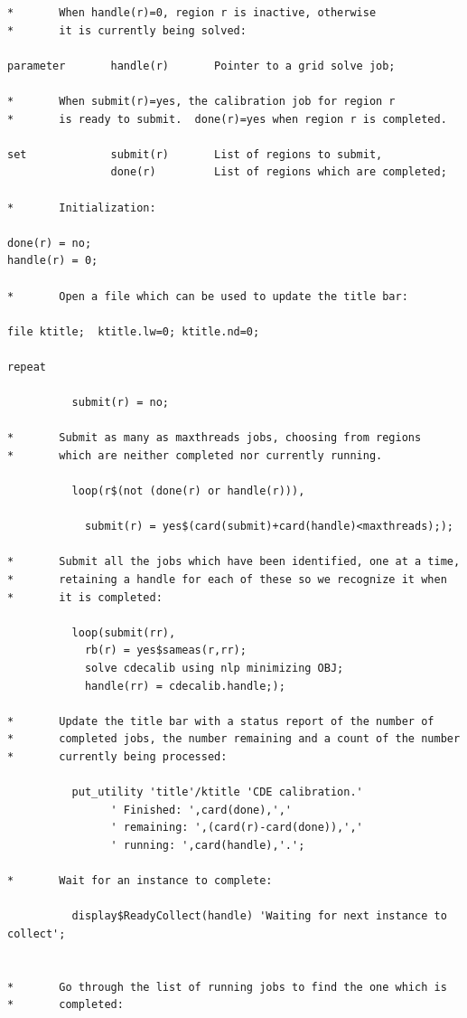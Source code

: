 \begin{Verbatim}
*       When handle(r)=0, region r is inactive, otherwise 
*       it is currently being solved:

parameter       handle(r)       Pointer to a grid solve job;

*       When submit(r)=yes, the calibration job for region r
*       is ready to submit.  done(r)=yes when region r is completed.

set             submit(r)       List of regions to submit,
                done(r)         List of regions which are completed;

*       Initialization:

done(r) = no;
handle(r) = 0;

*       Open a file which can be used to update the title bar:

file ktitle;  ktitle.lw=0; ktitle.nd=0;

repeat

          submit(r) = no;

*       Submit as many as maxthreads jobs, choosing from regions
*       which are neither completed nor currently running.  

          loop(r$(not (done(r) or handle(r))),

            submit(r) = yes$(card(submit)+card(handle)<maxthreads););

*       Submit all the jobs which have been identified, one at a time,
*       retaining a handle for each of these so we recognize it when
*       it is completed:

          loop(submit(rr),
            rb(r) = yes$sameas(r,rr);
            solve cdecalib using nlp minimizing OBJ;
            handle(rr) = cdecalib.handle;);

*       Update the title bar with a status report of the number of
*       completed jobs, the number remaining and a count of the number
*       currently being processed:

          put_utility 'title'/ktitle 'CDE calibration.'
                ' Finished: ',card(done),','
                ' remaining: ',(card(r)-card(done)),','
                ' running: ',card(handle),'.';

*       Wait for an instance to complete:

          display$ReadyCollect(handle) 'Waiting for next instance to collect';


*       Go through the list of running jobs to find the one which is
*       completed:


\end{Verbatim}
